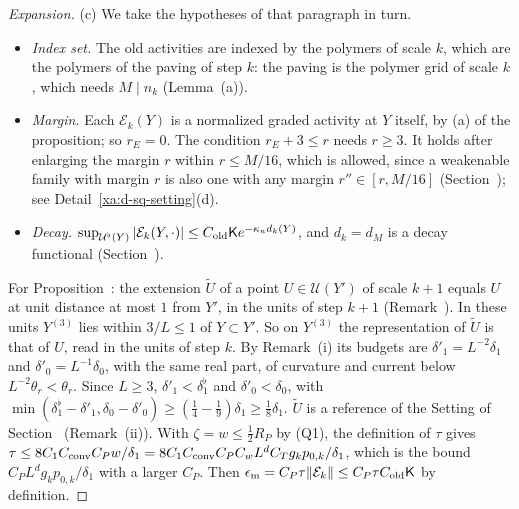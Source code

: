 \begin{proof}[Expansion]
(c) We take the hypotheses of that paragraph in turn.
\begin{itemize}
\item \emph{Index set.} The old activities are indexed by the polymers of scale $k$, which are the polymers of the paving of step $k$: the paving is the polymer grid of scale $k$, which needs $M\mid n_k$ (Lemma~(a)).
\item \emph{Margin.} Each $\mathcal E_k(Y)$ is a normalized graded activity at $Y$ itself, by (a) of the proposition; so $r_E=0$. The condition $r_E+3\le r$ needs $r\ge3$. It holds after enlarging the margin $r$ within $r\le M/16$, which is allowed, since a weakenable family with margin $r$ is also one with any margin $r''\in[r,M/16]$ (Section~); see Detail~\ref{xa:d-sq-setting}(d).
\item \emph{Decay.} $\sup_{\mathcal U^\flat(Y)}|\mathcal E_k(Y,\cdot)|\le C_{\rm old}\mathsf Ke^{-\kappa_nd_k(Y)}$, and $d_k=d_M$ is a decay functional (Section~).
\end{itemize}
For Proposition~: the extension $\tilde U$ of a point $U\in\mathcal U(Y')$ of scale $k+1$ equals $U$ at unit distance at most $1$ from $Y'$, in the units of step $k+1$ (Remark~). In these units $Y^{(3)}$ lies within $3/L\le1$ of $Y\subset Y'$. So on $Y^{(3)}$ the representation of $\tilde U$ is that of $U$, read in the units of step $k$. By Remark~(i) its budgets are $\delta'_1=L^{-2}\delta_1$ and $\delta'_0=L^{-1}\delta_0$, with the same real part, of curvature and current below $L^{-2}\theta_r<\theta_r$. Since $L\ge3$, $\delta'_1<\delta_1^\flat$ and $\delta'_0<\delta_0$, with $\min(\delta^\flat_1-\delta'_1,\delta_0-\delta'_0)\ge(\frac14-\frac19)\delta_1\ge\frac18\delta_1$. $\tilde U$ is a reference of the Setting of Section~ (Remark~(ii)). With $\zeta=w\le\frac12R_P$ by (Q1), the definition of $\tau$ gives $\tau\le8C_1C_{\rm conv}C_Pw/\delta_1=8C_1C_{\rm conv}C_PC_wL^dC_Tg_kp_{0,k}/\delta_1$, which is the bound $C_PL^dg_kp_{0,k}/\delta_1$ with a larger $C_P$. Then $\epsilon_{\rm m}=C_P\tau\|\mathcal E_k\|\le C_P\tau C_{\rm old}\mathsf K$ by definition.
\end{proof}

